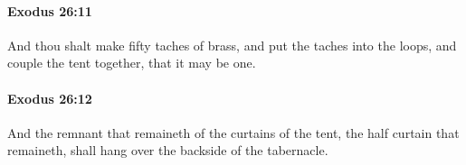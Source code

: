 		\paragraph{Exodus 26:11} %
			\label{EXODUS-26-11}

			And thou shalt make fifty taches of brass, and put the taches into the loops, and couple the tent together, that it may be one.


		\paragraph{Exodus 26:12} %
			\label{EXODUS-26-12}

			And the remnant that remaineth of the curtains of the tent, the half curtain that remaineth, shall hang over the backside of the tabernacle.


